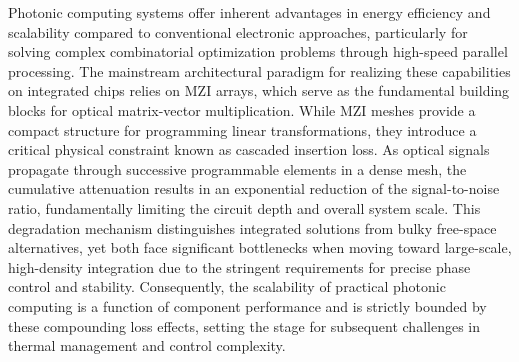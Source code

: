 \documentclass[11pt]{article}
\begin{document}
Photonic computing systems offer inherent advantages in energy efficiency and scalability compared to conventional electronic approaches, particularly for solving complex combinatorial optimization problems through high-speed parallel processing. The mainstream architectural paradigm for realizing these capabilities on integrated chips relies on MZI arrays, which serve as the fundamental building blocks for optical matrix-vector multiplication. \citep{doi_10_1088_1402_4896_ae8345_3b948559} While MZI meshes provide a compact structure for programming linear transformations, they introduce a critical physical constraint known as cascaded insertion loss. As optical signals propagate through successive programmable elements in a dense mesh, the cumulative attenuation results in an exponential reduction of the signal-to-noise ratio, fundamentally limiting the circuit depth and overall system scale. This degradation mechanism distinguishes integrated solutions from bulky free-space alternatives, yet both face significant bottlenecks when moving toward large-scale, high-density integration due to the stringent requirements for precise phase control and stability. Consequently, the scalability of practical photonic computing is a function of component performance and is strictly bounded by these compounding loss effects, setting the stage for subsequent challenges in thermal management and control complexity. \citep{doi_10_1088_1402_4896_ae8345_3b948559} \citep{doi_10_3390_nano14080697_c372a140}
\end{document}
